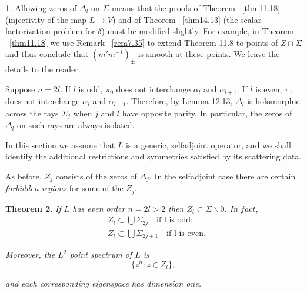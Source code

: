 \documentclass{surv-l}
\theoremstyle{plain}
\newtheorem{theorem}{Theorem}[section]
\theoremstyle{definition}
\newtheorem{remark}[theorem]{\sc{Remark}}
\numberwithin{equation}{chapter}
\begin{document}
\begin{remark}\label{rem16.4}
Allowing zeros of $\Delta_{l}$ on $\Sigma$ means that the proofs of Theorem ~\ref{thm11.18} (injectivity of the map $L\mapsto V$) and of Theorem ~\ref{thm14.13} (the scalar factorization problem for $\delta$) must be modified slightly. For example, in Theorem ~\ref{thm11.18} we use Remark ~\ref{rem7.35} to extend Theorem 11.8 to points of $ Z\cap\Sigma$ and thus conclude that $(m'm^{-1})_{\pm}$ is smooth at these points. We leave the details to the reader.

Suppose $n=2l$.  If $l$ is odd, $\pi_{0}$ does not interchange $\alpha_{l}$ and $\alpha_{l+1}$. If  $l$ is even, $\pi_{1}$ does not interchange $\alpha_{l}$ and $\alpha_{l+1}$. Therefore, by Lemma 12.13, $\Delta_{l}$ is holomorphic across the rays $\Sigma_{j}$ when $j$ and $l$ have opposite parity. In particular, the zeros of $\Delta_{l}$ on such rays are always isolated.

In this section we assume that $L$ is a generic, selfadjoint operator, and we shall identify the additional restrictions and symmetries satisfied by its scattering data.

As before, $Z_{j}$ consists of the zeros of $\Delta_{j}$. In the selfadjoint case there are certain \emph{forbidden regions} for some of the $Z_{j}$.
\end{remark}
\begin{theorem}\label{thm16.5}
If $L$ has even order $n=2l>2$  then $Z_{l}\subset\Sigma\backslash 0$.  In $fact$,
\begin{align*}
&Z_{l}\subset\bigcup\Sigma_{2j}\quad \text{if l is odd};\\
&Z_{l}\subset\bigcup\Sigma_{2j+1}\quad \text{if l is even}.
\end{align*}

Moreover, the $L^{2}$ point spectrum of $L$ is
\setcounter{equation}{5}
\begin{equation}\label{eq16.6}
\{z^{n}:z\in Z_{l}\},
\end{equation}

and each corresponding eigenspace has dimension one.
\end{theorem}
\end{document}

